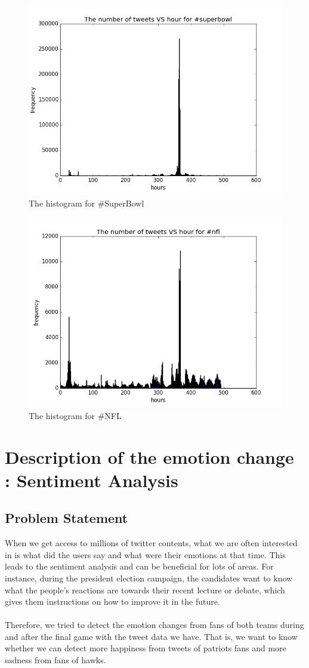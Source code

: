 \documentclass{article}
\begin{document}
\begin{figure}[htbp]
\centering
\includegraphics[width=.6\textwidth]{sp_hist.png}
\caption{The histogram for \#SuperBowl}
\label{fig:sp_hist}
\end{figure}
\begin{figure}[htbp]
\centering
\includegraphics[width=.6\textwidth]{nfl_hist.png}
\caption{The histogram for \#NFL}
\label{fig:nfl_hist}
\end{figure}
\section{Description of the emotion change : Sentiment Analysis}
\subsection{Problem Statement}
When we get access to millions of twitter contents, what we are often interested in is what did the users say and what were their emotions at that time. This leads to the sentiment analysis and can be beneficial for lots of areas. For instance, during the president election campaign, the candidates want to know what the people's reactions are towards their recent lecture or debate, which gives them instructions on how to improve it in the future.\\
\\
Therefore, we tried to detect the emotion changes from fans of both teams during and after the final game with the tweet data we have. That is, we want to know whether we can detect more happiness from tweets of patriots fans and more sadness from fans of hawks.
\end{document}

